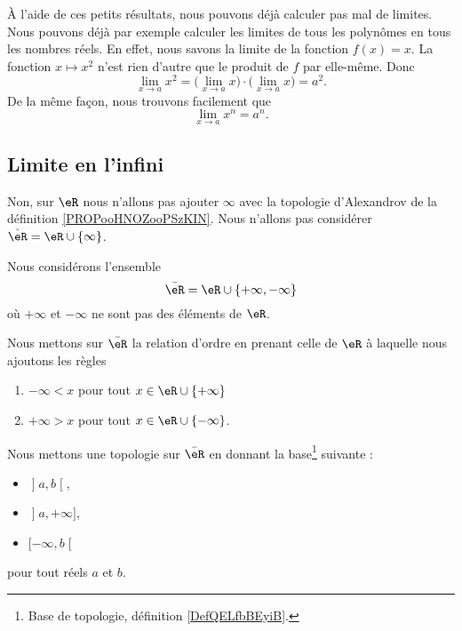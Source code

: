 À l'aide de ces petits résultats, nous pouvons déjà calculer pas mal de limites. Nous pouvons déjà par exemple calculer les limites de tous les polynômes en tous les nombres réels. En effet, nous savons la limite de la fonction $f(x)=x$. La fonction $x\mapsto x^2$ n'est rien d'autre que le produit de $f$ par elle-même. Donc
\[
  \lim_{x\to a}x^2=\big( \lim_{x\to a}x\big)\cdot\big( \lim_{x\to a}x \big)=a^2.
\]
De la même façon, nous trouvons facilement que
\begin{equation}
 \lim_{x\to a}x^n=a^n.
\end{equation}


\subsection{Limite en l'infini}

Non, sur \( \eR\) nous n'allons pas ajouter \( \infty\) avec la topologie d'Alexandrov de la définition \ref{PROPooHNOZooPSzKIN}. Nous n'allons pas considérer \( \hat \eR=\eR\cup\{ \infty \}\).

\begin{definition}       \label{DEFooRUyiBSUooALDDOa}
    Nous considérons l'ensemble
    \begin{equation}
        \bar \eR=\eR\cup\{ +\infty,-\infty \}
    \end{equation}
    où \( +\infty\) et \( -\infty\) ne sont pas des éléments de \( \eR\).

    Nous mettons sur \( \bar\eR\) la relation d'ordre en prenant celle de \( \eR\) à laquelle nous ajoutons les règles
    \begin{enumerate}
        \item
            \( -\infty<x\) pour tout \( x\in\eR\cup\{ +\infty \}\)
        \item
            \( +\infty>x\) pour tout \( x\in \eR\cup\{-\infty  \}\).
    \end{enumerate}

    Nous mettons une topologie sur \( \bar\eR\) en donnant la base\footnote{Base de topologie, définition \ref{DefQELfbBEyiB}.} suivante :
    \begin{itemize}
        \item \( \mathopen] a , b \mathclose[\),
        \item \( \mathopen] a , +\infty \mathclose]\),
        \item \( \mathopen[ -\infty , b \mathclose[\)
    \end{itemize}
    pour tout réels \( a\) et \( b\).
\end{definition}

